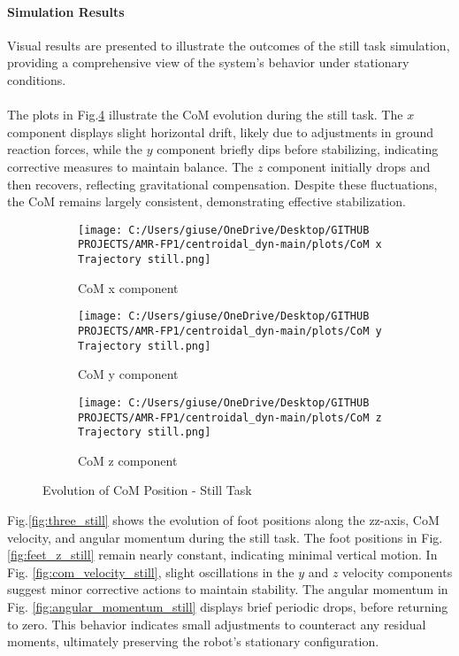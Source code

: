 \documentclass[main.tex]{subfiles}
\begin{document}
\paragraph{Simulation Results}
Visual results are presented to illustrate the outcomes of the still task simulation, providing a comprehensive view of the system’s behavior under stationary conditions.\\
\\
The plots in Fig.\ref{fig:com_still} illustrate the CoM evolution during the still task. The \( x \) component displays slight horizontal drift, likely due to adjustments in ground reaction forces, while the \( y \) component briefly dips before stabilizing, indicating corrective measures to maintain balance. The \( z \) component initially drops and then recovers, reflecting gravitational compensation. Despite these fluctuations, the CoM remains largely consistent, demonstrating effective stabilization. \\
\begin{figure}[H]
    \centering
    \begin{subfigure}[b]{0.32\textwidth}
        \centering
        \texttt{[image: C:/Users/giuse/OneDrive/Desktop/GITHUB PROJECTS/AMR-FP1/centroidal\_dyn-main/plots/CoM x Trajectory still.png]}
        \caption{CoM x component}
        \label{fig:com_x_still}
    \end{subfigure}
    \hfill
    \begin{subfigure}[b]{0.32\textwidth}
        \centering
        \texttt{[image: C:/Users/giuse/OneDrive/Desktop/GITHUB PROJECTS/AMR-FP1/centroidal\_dyn-main/plots/CoM y Trajectory still.png]}
        \caption{CoM y component}
        \label{fig:com_y_still}
    \end{subfigure}
    \hfill
    \begin{subfigure}[b]{0.32\textwidth}
        \centering
        \texttt{[image: C:/Users/giuse/OneDrive/Desktop/GITHUB PROJECTS/AMR-FP1/centroidal\_dyn-main/plots/CoM z Trajectory still.png]}
        \caption{CoM z component}
        \label{fig:com_z_still}
    \end{subfigure}
    \caption{Evolution of CoM Position - Still Task}
    \label{fig:com_still}
\end{figure}
Fig.\ref{fig:three_still} shows the evolution of foot positions along the zz-axis, CoM velocity, and angular momentum during the still task. The foot positions in Fig. \ref{fig:feet_z_still} remain nearly constant, indicating minimal vertical motion. In Fig. \ref{fig:com_velocity_still}, slight oscillations in the $y$ and $z$ velocity components suggest minor corrective actions to maintain stability. The angular momentum in Fig. \ref{fig:angular_momentum_still} displays brief periodic drops, before returning to zero. This behavior indicates small adjustments to counteract any residual moments, ultimately preserving the robot’s stationary configuration. \\
\end{document}
